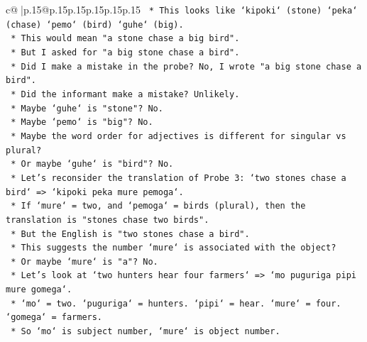 \documentclass{article}
\begin{document}
{\begin{supertabular}{c@{$\;$}|p{.15\linewidth}@{}p{.15\linewidth}p{.15\linewidth}p{.15\linewidth}p{.15\linewidth}p{.15\linewidth}}
{{{\texttt{                                            *   This looks like `kipoki` (stone) `peka` (chase) `pemo` (bird) `guhe` (big).} \\
\texttt{                                            *   This would mean "a stone chase a big bird".} \\
\texttt{                                            *   But I asked for "a big stone chase a bird".} \\
\texttt{                                            *   Did I make a mistake in the probe? No, I wrote "a big stone chase a bird".} \\
\texttt{                                            *   Did the informant make a mistake? Unlikely.} \\
\texttt{                                            *   Maybe `guhe` is "stone"? No.} \\
\texttt{                                            *   Maybe `pemo` is "big"? No.} \\
\texttt{                                            *   Maybe the word order for adjectives is different for singular vs plural?} \\
\texttt{                                            *   Or maybe `guhe` is "bird"? No.} \\
\texttt{                                            *   Let's reconsider the translation of Probe 3: `two stones chase a bird` => `kipoki peka mure pemoga`.} \\
\texttt{                                            *   If `mure` = two, and `pemoga` = birds (plural), then the translation is "stones chase two birds".} \\
\texttt{                                            *   But the English is "two stones chase a bird".} \\
\texttt{                                            *   This suggests the number `mure` is associated with the object?} \\
\texttt{                                            *   Or maybe `mure` is "a"? No.} \\
\texttt{                                            *   Let's look at `two hunters hear four farmers` => `mo puguriga pipi mure gomega`.} \\
\texttt{                                            *   `mo` = two. `puguriga` = hunters. `pipi` = hear. `mure` = four. `gomega` = farmers.} \\
\texttt{                                            *   So `mo` is subject number, `mure` is object number.} \\
}}}
\end{supertabular}}
\end{document}
